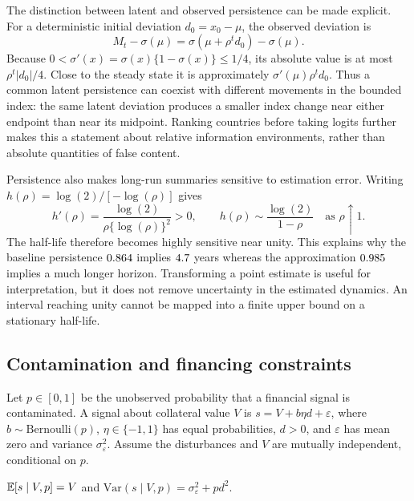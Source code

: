 The distinction between latent and observed persistence can be made explicit.
For a deterministic initial deviation $d_0=x_0-\mu$, the observed deviation is
\begin{equation}\label{eq:index-deviation}
 M_t-\sigma(\mu)=\sigma(\mu+\rho^td_0)-\sigma(\mu).
\end{equation}
Because $0<\sigma'(x)=\sigma(x)\{1-\sigma(x)\}\le1/4$, its absolute
value is at most $\rho^t|d_0|/4$. Close to the steady state it is approximately
$\sigma'(\mu)\rho^td_0$. Thus a common latent persistence can coexist with
different movements in the bounded index: the same latent deviation produces
a smaller index change near either endpoint than near its midpoint. Ranking
countries before taking logits further makes this a statement about relative
information environments, rather than absolute quantities of false content.

Persistence also makes long-run summaries sensitive to estimation error.
Writing $h(\rho)=\log(2)/[-\log(\rho)]$ gives
\begin{equation}\label{eq:half-sensitivity}
 h'(\rho)=\frac{\log(2)}{\rho\{\log(\rho)\}^2}>0,
 \qquad h(\rho)\sim\frac{\log(2)}{1-\rho}\quad\text{as }\rho\uparrow1.
\end{equation}
The half-life therefore becomes highly sensitive near unity. This explains
why the baseline persistence $0.864$ implies $4.7$ years whereas the
approximation $0.985$ implies a much longer horizon. Transforming a point
estimate is useful for interpretation, but it does not remove uncertainty in
the estimated dynamics. An interval reaching unity cannot be mapped into a
finite upper bound on a stationary half-life.

\subsection{Contamination and financing constraints}\label{subsec:pollution}
Let $p\in[0,1]$ be the unobserved probability that a financial signal is
contaminated. A signal about collateral value $V$ is
$s=V+b\eta d+\varepsilon$, where $b\sim\mathrm{Bernoulli}(p)$,
$\eta\in\{-1,1\}$ has equal probabilities, $d>0$, and $\varepsilon$ has
mean zero and variance $\sigma_\varepsilon^2$. Assume the disturbances and
$V$ are mutually independent, conditional on $p$.

\begin{lemma}\label{lem:pollution}
$\mathbb{E}[s\mid V,p]=V$ and
$\mathrm{Var}(s\mid V,p)=\sigma_\varepsilon^2+pd^2$.
\end{lemma}

